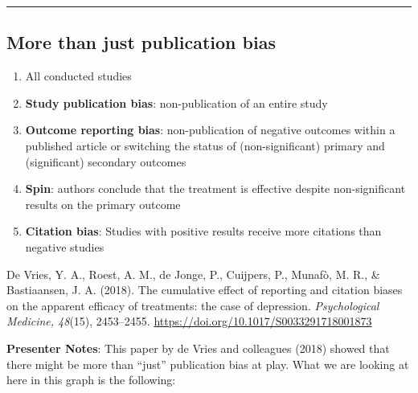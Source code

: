 \documentclass[
  english,
  letterpaper,
  DIV=11,
  numbers=noendperiod]{scrartcl}
\providecommand{\tightlist}{%
  \setlength{\itemsep}{0pt}\setlength{\parskip}{0pt}}
\begin{document}
\begin{center}\rule{0.5\linewidth}{0.5pt}\end{center}

\subsection{More than just publication
bias}\label{more-than-just-publication-bias}

\begin{enumerate}
\def\labelenumi{(\alph{enumi})}
\tightlist
\item
  All conducted studies
\item
  \textbf{Study publication bias}: non-publication of an entire study
\item
  \textbf{Outcome reporting bias}: non-publication of negative outcomes
  within a published article or switching the status of
  (non-significant) primary and (significant) secondary outcomes
\item
  \textbf{Spin}: authors conclude that the treatment is effective
  despite non-significant results on the primary outcome
\item
  \textbf{Citation bias}: Studies with positive results receive more
  citations than negative studies
\end{enumerate}

De Vries, Y. A., Roest, A. M., de Jonge, P., Cuijpers, P., Munafò, M.
R., \& Bastiaansen, J. A. (2018). The cumulative effect of reporting and
citation biases on the apparent efficacy of treatments: the case of
depression. \emph{Psychological Medicine, 48}(15), 2453--2455.
\url{https://doi.org/10.1017/S0033291718001873}

\textbf{Presenter Notes}: This paper by de Vries and colleagues (2018)
showed that there might be more than ``just'' publication bias at play.
What we are looking at here in this graph is the following:
\end{document}
